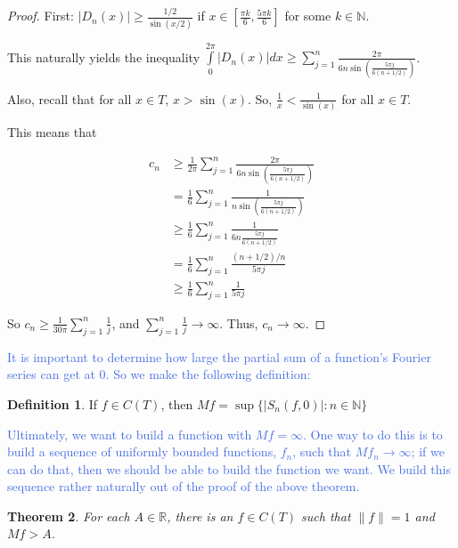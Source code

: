 \documentclass{amsart}
\newcommand{\N}{\mathbb{N}}
\newcommand{\R}{\mathbb{R}}
\newcommand{\colorcomment}[2]{\textcolor{#1}{#2}} %
\newcommand{\absval}[1]{\lvert #1 \rvert}
\newcommand{\norm}[1]{\|#1\|}
\newtheorem{thm}{Theorem}[section]
\theoremstyle{definition}
\newtheorem{definition}[thm]{Definition}
\begin{document}
\begin{proof}

First: $\absval{D_n(x)} \geq \frac{1/2}{\sin(x/2)}$ if $x \in [\frac{\pi k}{6},\frac{5 \pi k}{6}]$ for some $k \in \N$.

This naturally yields the inequality $\int\limits_0^{2\pi} \absval{D_n(x)} dx \geq \sum\limits_{j=1}^n \frac{2 \pi}{6n \sin(\frac{5\pi j}{6(n+1/2)})}$. 


Also, recall that for all $x \in T$, $x > \sin(x)$. 
So, $\frac{1}{x} < \frac{1}{\sin(x)}$ for all $x \in T$.

This means that 

\begin{align*}
c_n &\geq \frac{1}{2 \pi} \sum\limits_{j=1}^n \frac{2 \pi}{6n \sin(\frac{5\pi j}{6(n+1/2)})}\\
&= \frac{1}{6} \sum\limits_{j=1}^n \frac{1}{n \sin(\frac{5\pi j}{6(n+1/2)})}\\
&\geq \frac{1}{6} \sum\limits_{j=1}^n \frac{1}{6n \frac{5\pi j}{6(n+1/2)}}\\
&= \frac{1}{6} \sum\limits_{j=1}^n \frac{(n+1/2)/{n}}{5\pi j}\\
&\geq \frac{1}{6} \sum\limits_{j=1}^n \frac{1}{5\pi j}
\end{align*}

So $c_n \geq \frac{1}{30 \pi} \sum\limits_{j=1}^n \frac{1}{ j}$, and $\sum\limits_{j=1}^n \frac{1}{j} \to \infty$. 
Thus, $c_n \to \infty$.

\end{proof}

\colorcomment{RoyalBlue}{It is important to determine how large the partial sum of a function's Fourier series can get at $0$. 
So we make the following definition:}

\begin{definition}
If $f \in C(T)$, then $Mf = \sup\{\absval{S_n(f,0)} : n \in \N\}$ 
\end{definition}

\colorcomment{RoyalBlue}{Ultimately, we want to build a function with $Mf = \infty$.
One way to do this is to build a sequence of uniformly bounded functions, $f_n$, such that $Mf_n \to \infty$; 
if we can do that, then we should be able to build the function we want.
We build this sequence rather naturally out of the proof of the above theorem.}

\begin{thm}
For each $A \in \R$, there is an $f \in C(T)$ such that $\norm{f} = 1$ and $Mf > A$. 
\end{thm}
\end{document}
